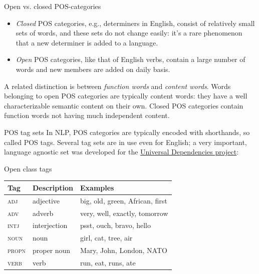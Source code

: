 \documentclass[style=upen, size=14pt]{powerdot}
\newcommand{\gold}{\color{arany}}
\begin{document}
\begin{slide}[toc=]{Open vs. closed POS-categories}
  \begin{itemize}
  \item \emph{\gold Closed} POS categories, e.g., determiners in English, consist of
    relatively small sets of words, and these sets do not change easily: it's a
    rare phenomenon that a new determiner is added to a language.
  \item \emph{\gold Open} POS categories, like that of English verbs, contain a
    large number of words and new members are added on daily basis.
  \end{itemize}
  A related distinction is between \emph{function words} and \emph{content
    words}. Words belonging to open POS categories are typically content words:
  they have a well characterizable semantic content on their own. Closed POS
  categories contain function words not having much independent content.
\end{slide}

\begin{slide}[toc=]{POS tag sets}
  In NLP, POS categories are typically encoded with shorthands, so called POS
  tags. Several tag sets are in use even for English; a very important, language
  agnostic set was developed for the
  \href{https://universaldependencies.org/}{Universal Dependencies
    project}:\smallskip

  \begin{center}
    \small
    Open class tags\smallskip
    
    \begin{tabular}{lll}
      \hline
      Tag & Description & Examples\\
      \hline
      \textsc{adj} & adjective & big, old, green, African, first\\
      \textsc{adv} & adverb & very, well, exactly, tomorrow\\
      \textsc{intj} & interjection & psst, ouch, bravo, hello\\
      \textsc{noun} & noun & girl, cat, tree, air\\
      \textsc{propn} & proper noun & Mary, John, London, NATO\\
      \textsc{verb} & verb & run, eat, runs, ate\\
    \end{tabular}
  \end{center}
\end{slide}
\end{document}
